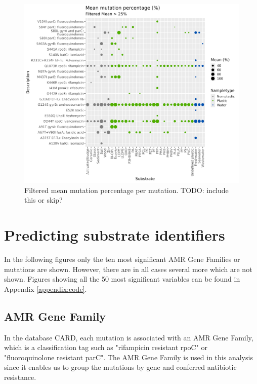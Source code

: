 \begin{figure}[!h]
    \centering
    \includegraphics[width = \textwidth]{figure/relative_mean_points_25.png}
    \caption{Filtered mean mutation percentage per mutation. TODO: include this or skip?}
    \label{pointplot_mutations}
\end{figure}


\section{Predicting substrate identifiers} 
%
In the following figures only the ten most significant AMR Gene Families or mutations are shown. However, there are in all cases several more which are not shown. 
Figures showing all the 50 most significant variables can be found in Appendix \ref{appendix:code}.

\subsection{AMR Gene Family}
In the database CARD, each mutation is associated with an AMR Gene Family, which is a classification tag such as "rifampicin resistant rpoC" or "fluoroquinolone resistant parC". The AMR Gene Family is used in this analysis since it enables us to group the mutations by gene and conferred antibiotic resistance.

